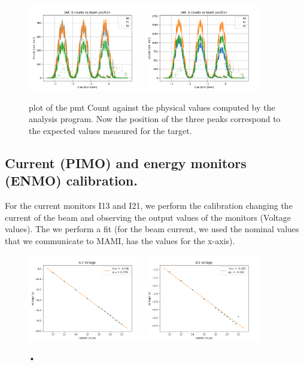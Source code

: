 \begin{figure}[hbtp]
\centering
\includegraphics[width=0.45\textwidth]{Analysis/XcheckB.png} 
\includegraphics[width=0.45\textwidth]{Analysis/XcheckA.png}
\caption{plot of the pmt Count against the physical values computed by the analysis program. Now the position of the three peaks correspond to the expected values measured for the target.}
\label{fig:CheckHori}
\end{figure}


\subsection{Current (PIMO) and energy monitors (ENMO) calibration.} \label{CurrentCalibration}

For the current monitors I13 and I21, we perform the calibration changing the current of the beam and observing the output values of the monitors (Voltage values). The we perform a fit (for the beam current, we used the nominal values that we communicate to MAMI, has the values for the x-axis).

\begin{figure}[hbtp]
\centering
\includegraphics[width = 0.45\textwidth]{Analysis/I13_Calibration.png}
\includegraphics[width = 0.45\textwidth]{Analysis/I21_Calibration.png} 
\caption{•}
\end{figure}


